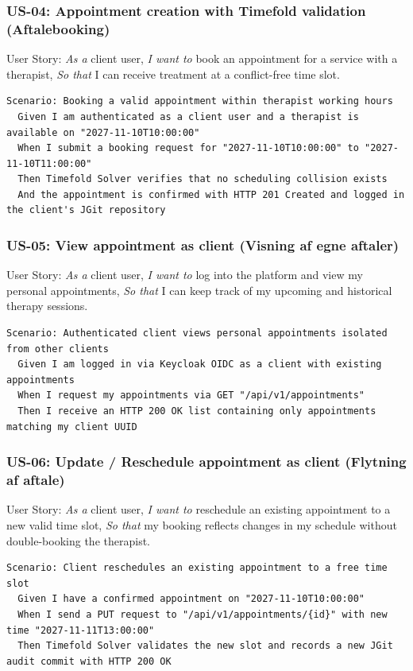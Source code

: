 \documentclass[11pt,a4paper]{article}
\begin{document}
\subsubsection{US-04: Appointment creation with Timefold validation (Aftalebooking)}
User Story: \textit{As a} client user, \textit{I want to} book an appointment for a service with a therapist, \textit{So that} I can receive treatment at a conflict-free time slot.
\begin{lstlisting}[language={}]
Scenario: Booking a valid appointment within therapist working hours
  Given I am authenticated as a client user and a therapist is available on "2027-11-10T10:00:00"
  When I submit a booking request for "2027-11-10T10:00:00" to "2027-11-10T11:00:00"
  Then Timefold Solver verifies that no scheduling collision exists
  And the appointment is confirmed with HTTP 201 Created and logged in the client's JGit repository
\end{lstlisting}

\subsubsection{US-05: View appointment as client (Visning af egne aftaler)}
User Story: \textit{As a} client user, \textit{I want to} log into the platform and view my personal appointments, \textit{So that} I can keep track of my upcoming and historical therapy sessions.
\begin{lstlisting}[language={}]
Scenario: Authenticated client views personal appointments isolated from other clients
  Given I am logged in via Keycloak OIDC as a client with existing appointments
  When I request my appointments via GET "/api/v1/appointments"
  Then I receive an HTTP 200 OK list containing only appointments matching my client UUID
\end{lstlisting}

\subsubsection{US-06: Update / Reschedule appointment as client (Flytning af aftale)}
User Story: \textit{As a} client user, \textit{I want to} reschedule an existing appointment to a new valid time slot, \textit{So that} my booking reflects changes in my schedule without double-booking the therapist.
\begin{lstlisting}[language={}]
Scenario: Client reschedules an existing appointment to a free time slot
  Given I have a confirmed appointment on "2027-11-10T10:00:00"
  When I send a PUT request to "/api/v1/appointments/{id}" with new time "2027-11-11T13:00:00"
  Then Timefold Solver validates the new slot and records a new JGit audit commit with HTTP 200 OK
\end{lstlisting}
\end{document}
